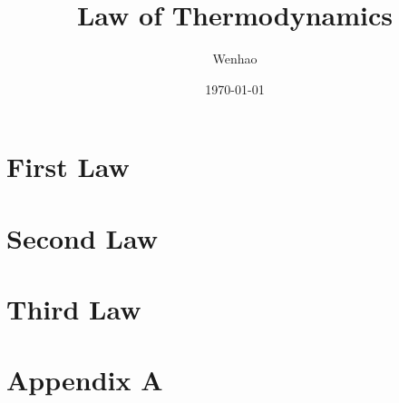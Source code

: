 \documentclass{article}
\begin{document}
\title{Law of Thermodynamics}
\author{Wenhao}
\date{\today}
\maketitle

\section{First Law}

\section{Second Law}

\section{Third Law}

\pagebreak
\section*{Appendix A}
\end{document}
